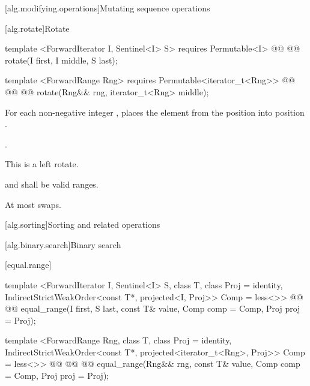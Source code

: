 \setcounter{section}{3}

[alg.modifying.operations]{Mutating sequence operations}

\setcounter{subsection}{10}

[alg.rotate]{Rotate}

%
\begin{itemdecl}
template <ForwardIterator I, Sentinel<I> S>
  requires Permutable<I>
  @@
  @@
    rotate(I first, I middle, S last);

template <ForwardRange Rng>
  requires Permutable<iterator_t<Rng>>
  @@
              @@
  @@
    rotate(Rng&& rng, iterator_t<Rng> middle);
\end{itemdecl}

\begin{itemdescr}
\pnum
\effects
For each non-negative integer
,
places the element from the position
into position
.

\pnum
\returns {}.

\pnum
\notes
This is a left rotate.

\pnum
\requires
{}
and
shall be valid ranges.

\pnum
\complexity
At most
swaps.
\end{itemdescr}

[alg.sorting]{Sorting and related operations}

\setcounter{subsection}{2}

[alg.binary.search]{Binary search}

\setcounter{subsubsection}{2}

[equal.range]{}

%
\begin{itemdecl}
template <ForwardIterator I, Sentinel<I> S, class T, class Proj = identity,
    IndirectStrictWeakOrder<const T*, projected<I, Proj>> Comp = less<>>
  @@
  @@
    equal_range(I first, S last, const T& value, Comp comp = Comp{}, Proj proj = Proj{});

template <ForwardRange Rng, class T, class Proj = identity,
    IndirectStrictWeakOrder<const T*, projected<iterator_t<Rng>, Proj>> Comp = less<>>
  @@
              @@
  @@
    equal_range(Rng&& rng, const T& value, Comp comp = Comp{}, Proj proj = Proj{});
\end{itemdecl}

